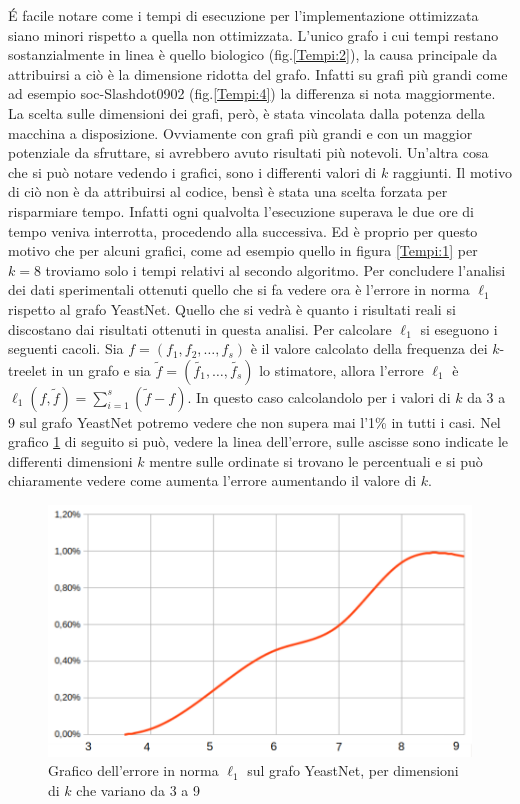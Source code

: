 É facile notare come i tempi di esecuzione per l'implementazione ottimizzata siano minori rispetto a quella non ottimizzata.
L'unico grafo i cui tempi restano sostanzialmente in linea è quello biologico (fig.\ref{Tempi:2}), la causa principale da attribuirsi a ciò è la dimensione ridotta del grafo.
Infatti su grafi più grandi come ad esempio soc-Slashdot0902 (fig.\ref{Tempi:4}) la differenza si nota maggiormente. 
La scelta sulle dimensioni dei grafi, però, è stata vincolata dalla potenza della macchina a disposizione.
Ovviamente con grafi più grandi e con un maggior potenziale da sfruttare, si avrebbero avuto risultati più notevoli.
Un'altra cosa che si può notare vedendo i grafici, sono i differenti valori di $ k $ raggiunti.
Il motivo di ciò non è da attribuirsi al codice, bensì è stata una scelta forzata per risparmiare tempo.
Infatti ogni qualvolta l'esecuzione superava le due ore di tempo veniva interrotta, procedendo alla successiva.
Ed è proprio per questo motivo che per alcuni grafici, come ad esempio quello in figura \ref{Tempi:1} per $ k=8$ troviamo solo i tempi relativi al secondo algoritmo.
Per concludere l'analisi dei dati sperimentali ottenuti quello che si fa vedere ora è l'errore in norma $ \ell_1 $ rispetto al grafo YeastNet.
Quello che si vedrà è quanto i risultati reali si discostano dai risultati ottenuti in questa analisi.
Per calcolare $ \ell_1 $ si eseguono i seguenti cacoli. 
Sia $ f=(f_1,f_2,\dots,f_s) $ è il valore calcolato della frequenza dei $ k $-treelet in un grafo e sia $ \tilde{f}=(\tilde{f_1},\dots,\tilde{f_s}) $ lo stimatore, allora l'errore $ \ell_1 $ è $ \ell_1(f,\tilde{f}) = \sum_{i=1}^{s}{ (\tilde{f}-f)}$.
In questo caso calcolandolo per i valori di $ k $ da 3 a 9 sul grafo YeastNet potremo vedere che non supera mai l'1\% in tutti i casi.
Nel grafico \ref{ERROR} di seguito si può, vedere la linea dell'errore, sulle ascisse sono indicate le differenti dimensioni $ k $ mentre sulle ordinate si trovano le percentuali e si può chiaramente vedere come aumenta l'errore aumentando il valore di $ k $.   
\begin{figure}[htbp]
	\includegraphics[width=15.4cm]{capitolo4/grafoErrorel1}
	\caption{Grafico dell'errore in norma $ \ell_1 $ sul grafo YeastNet, per dimensioni di $ k $ che variano da 3 a 9}
	\label{ERROR}
\end{figure}

